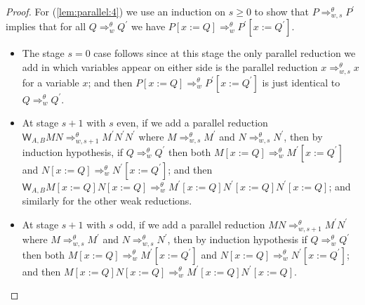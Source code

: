 \documentclass{lmcs} %
\newcommand{\param}{\theta}
\newcommand{\Reduces}[2]{\Rightarrow_{#1}^{#2}}
\newcommand{\ctW}[4]{{\mathsf W}_{#1, #2}#3#4}
\begin{document}
\begin{proof}
For (\ref{lem:parallel:4}) we use an induction on $s\geq 0$ to show that $P\Reduces{w,s}{\param} P^{\prime}$ implies that for all  $Q\Reduces{w}{\param} Q^{\prime}$ we have $P[x:=Q]\Reduces{w}{\param} P^{\prime}[x:=Q^{\prime}]$.
\begin{proofdetail}
\begin{itemize}[leftmargin=*]
    \item The stage $s=0$ case follows since at this stage the only parallel reduction we add in which variables appear on either side is the parallel reduction $x\Reduces{w,s}{\param} x$ for a variable $x$; and then $P[x:=Q]\Reduces{w}{\param} P^{\prime}[x:=Q^{\prime}]$ is just identical to $Q\Reduces{w}{\param} Q^{\prime}$.
    \item At stage $s+1$ with $s$ even, if we add a parallel reduction $\ctW{A}{B}{M}{N}\Reduces{w,s+1}{\param} M^{\prime}N^{\prime}N^{\prime}$ where $M\Reduces{w,s}{\param} M^{\prime}$ and $N\Reduces{w,s}{\param} N^{\prime}$, then by induction hypothesis, if $Q\Reduces{w}{\param} Q^{\prime}$ then both $M[x:=Q]\Reduces{w}{\param} M^{\prime}[x:=Q^{\prime}]$ and $N[x:=Q]\Reduces{w}{\param} N^{\prime}[x:=Q^{\prime}]$; and then $\ctW{A}{B}{M[x:=Q]}{N[x:=Q]} \Reduces{w}{\param} M^{\prime}[x:=Q] N^{\prime}[x:=Q] N^{\prime}[x:=Q]$; and similarly for the other weak reductions.
    \item At stage $s+1$ with $s$ odd, if we add a parallel reduction $MN\Reduces{w,s+1}{\param} M^{\prime}N^{\prime}$ where $M\Reduces{w,s}{\param} M^{\prime}$ and $N\Reduces{w,s}{\param} N^{\prime}$, then by induction hypothesis if $Q\Reduces{w}{\param} Q^{\prime}$ then both $M[x:=Q]\Reduces{w}{\param} M^{\prime}[x:=Q^{\prime}]$ and $N[x:=Q]\Reduces{w}{\param} N^{\prime}[x:=Q^{\prime}]$; and then $M[x:=Q] N[x:=Q] \Reduces{w}{\param}M^{\prime}[x:=Q] N^{\prime}[x:=Q]$.
\end{itemize}
\end{proofdetail}
\end{proof}
\end{document}
